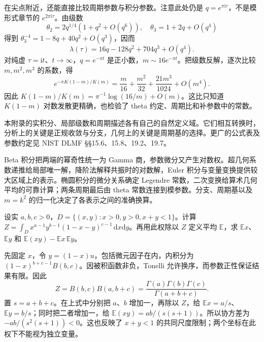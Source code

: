 在尖点附近，还能直接比较周期参数与积分参数。注意此处仍是 \(q=e^{\pi\mathrm{i}\tau}\)，不是模形式章节的 \(e^{2\pi\mathrm{i}\tau}\)。由级数
\[
\theta_2=2q^{1/4}(1+q^2+O(q^6)),\quad
\theta_3=1+2q+O(q^4)
\]
得到 \(\theta_3^{-4}=1-8q+40q^2+O(q^3)\)，因而
\[
\lambda(\tau)=16q-128q^2+704q^3+O(q^4).
\]
对纯虚 \(\tau=\mathrm{i}t\)、\(t\to\infty\)，\(q=e^{-\pi t}\) 是正小数，\(m\sim16e^{-\pi t}\)。把级数反解，逐次比较 \(m,m^2,m^3\) 的系数，得
\[
e^{-\pi K(1-m)/K(m)}=\frac m{16}+\frac{m^2}{32}
+\frac{21m^3}{1024}+O(m^4).
\]
因此 \(K(1-m)/K(m)=\pi^{-1}\log(16/m)+O(m)\)。这比只知道 \(K(1-m)\) 对数发散更精确，也检验了 theta 约定、周期比和补参数中的常数。

\ProseParagraphBreak
本附录的实积分、局部级数和周期描述各有自己的自然定义域。它们相互转换时，分析上的关键是正规收敛与分支，几何上的关键是周期基的选择。更广的公式表及参数约定见 NIST DLMF §§15.6、15.8、19.2、19.7\cite{NationalInstituteofStandardsNIST}。

\begin{chaptersummary}
Beta 积分把两端的幂奇性统一为 Gamma 商，参数微分又产生对数权。超几何系数递推给局部唯一解，降阶法解释共振时的对数解，Euler 积分与变量变换提供较大区域上的表示。椭圆积分的微分关系确定 Legendre 常数，二次变换给算术几何平均的可靠计算；两条周期最后由 theta 常数连接到模参数。分支、周期基以及 \(m=k^2\) 的归一化决定了各表示之间的准确换算。
\end{chaptersummary}
\BookExercises
\begin{exercise}\label{b3:ex:F-1}
设实 \(a,b,c>0\)，\(D=\{(x,y):x>0,y>0,x+y<1\}\)。计算
\(Z=\int_Dx^{a-1}y^{b-1}(1-x-y)^{c-1}\,\mathrm{d}x\mathrm{d}y\)。再用此权除以 \(Z\) 定义平均 \(\mathbb E\)，求 \(\mathbb E x\)、\(\mathbb E y\) 和 \(\mathbb E(xy)-\mathbb E x\,\mathbb E y\)。
\end{exercise}
\begin{solution}
先固定 \(x\)，令 \(y=(1-x)u\)，包括微元因子在内，内积分为 \((1-x)^{b+c-1}B(b,c)\)。因被积函数非负，Tonelli 允许换序，而参数正性保证结果有限。因此
\[
 Z=B(b,c)B(a,b+c)=\frac{\Gamma(a)\Gamma(b)\Gamma(c)}{\Gamma(a+b+c)}.
\]
置 \(s=a+b+c\)。在上式中分别把 \(a\)、\(b\) 增加一，再除以 \(Z\)，给 \(\mathbb E x=a/s\)、\(\mathbb E y=b/s\)；同时把二者增加一，给 \(\mathbb E(xy)=ab/(s(s+1))\)。所以协方差为 \(-ab/(s^2(s+1))<0\)。这也反映了 \(x+y<1\) 的共同尺度限制；两个坐标在此权下不能视为独立变量。
\end{solution}

